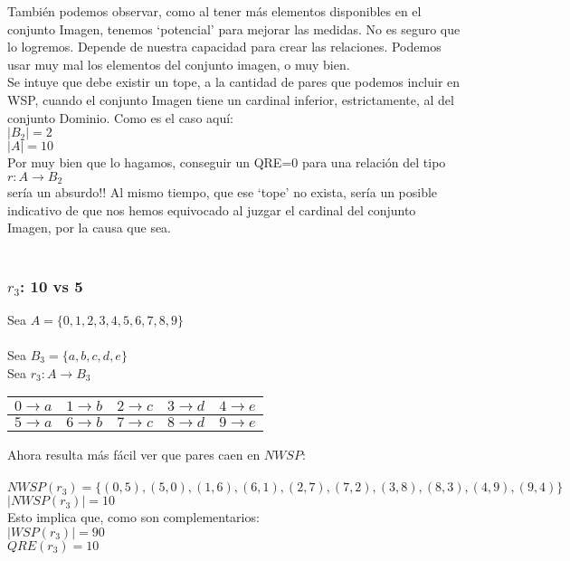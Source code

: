 	\noindent
	También podemos observar, como al tener más elementos disponibles en el conjunto Imagen, tenemos `potencial' para mejorar las medidas. No es seguro que lo logremos. Depende de nuestra capacidad para crear las relaciones. Podemos usar muy mal los elementos del conjunto imagen, o muy bien. 
	\\
	
	\noindent
	Se intuye que debe existir un tope, a la cantidad de pares que podemos incluir en WSP, cuando el conjunto Imagen tiene un cardinal inferior, estrictamente, al del conjunto Dominio. Como es el caso aquí:\\ 
	$|B_{2}|=2$\\ 
	$|A|=10$\\
	Por muy bien que lo hagamos, conseguir un QRE=0 para una relación del tipo\\
	$r:A \longrightarrow B_{2}$\\
	sería un absurdo!! Al mismo tiempo, que ese `tope' no exista, sería un posible indicativo de que nos hemos equivocado al juzgar el cardinal del conjunto Imagen, por la causa que sea.
	\\\\
	
	\subsubsection{$r_{3}$: 10 vs 5}
	
	\noindent
	Sea $A=\{0,1,2,3,4,5,6,7,8,9\}$\\\\
	Sea $B_{3} = \{a,b,c,d,e\}$
	\\
	
	\noindent
	Sea $r_{3}:A \longrightarrow B_{3}$
	\begin{table}[h!]
		\begin{tabular}{|c|c|c|c|c|}
			\hline
			$0 \longrightarrow a$ & $1 \longrightarrow b$ & $2 \longrightarrow c$ & $3 \longrightarrow d$ & $4 \longrightarrow e$ \\ 
			\hline
			$5 \longrightarrow a$ & $6 \longrightarrow b$ & $7 \longrightarrow c$ & $8 \longrightarrow d$ & $9 \longrightarrow e$ \\  
			\hline
		\end{tabular}
	\end{table}
	
	\noindent
	Ahora resulta más fácil ver que pares caen en $NWSP$: \\\\
	$NWSP(r_{3})=\{ (0,5), (5,0), (1,6), (6,1), (2,7), (7,2), (3,8), (8,3), (4,9), (9,4)\}$\\
	$|NWSP(r_{3})| = 10$\\
	Esto implica que, como son complementarios:\\
	$|WSP(r_{3})| = 90$\\
	$QRE(r_{3})=10$
	\\
	
